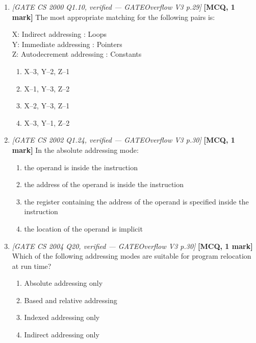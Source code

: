 \documentclass[11pt]{article}
\begin{document}
\begin{enumerate}
\item[\textbf{Q4}] \textit{[GATE CS 2000 Q1.10, verified --- GATEOverflow V3 p.29]} \textbf{[MCQ, 1 mark]} The most appropriate matching for the following pairs is:
\begin{center}
\small
X: Indirect addressing : Loops \\
Y: Immediate addressing : Pointers \\
Z: Autodecrement addressing : Constants
\end{center}
\begin{enumerate}
  \item[(A)] X--3, Y--2, Z--1
  \item[(B)] X--1, Y--3, Z--2
  \item[(C)] X--2, Y--3, Z--1
  \item[(D)] X--3, Y--1, Z--2
\end{enumerate}

\item[\textbf{Q5}] \textit{[GATE CS 2002 Q1.24, verified --- GATEOverflow V3 p.30]} \textbf{[MCQ, 1 mark]} In the absolute addressing mode:
\begin{enumerate}
  \item[(A)] the operand is inside the instruction
  \item[(B)] the address of the operand is inside the instruction
  \item[(C)] the register containing the address of the operand is specified inside the instruction
  \item[(D)] the location of the operand is implicit
\end{enumerate}

\item[\textbf{Q6}] \textit{[GATE CS 2004 Q20, verified --- GATEOverflow V3 p.30]} \textbf{[MCQ, 1 mark]} Which of the following addressing modes are suitable for program relocation at run time?
\begin{enumerate}
  \item[(A)] Absolute addressing only
  \item[(B)] Based and relative addressing
  \item[(C)] Indexed addressing only
  \item[(D)] Indirect addressing only
\end{enumerate}


\end{enumerate}
\end{document}
